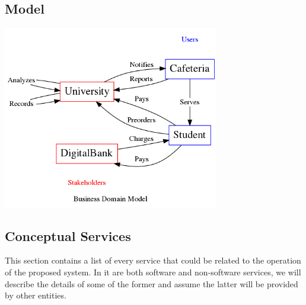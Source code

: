 \documentclass[11pt]{article}
\begin{document}
\subsection{Model}
\label{sec:org96df7f4}
\begin{center}
\includegraphics[height=8cm]{res/business_domain.png}
\end{center}

\subsection{Conceptual Services}
\label{sec:orga7dd9da}
This section contains a list of every service that could be related
to the operation of the proposed system. In it are both software
and non-software services, we will describe the details of some of
the former and assume the latter will be provided by other
entities.
\end{document}
